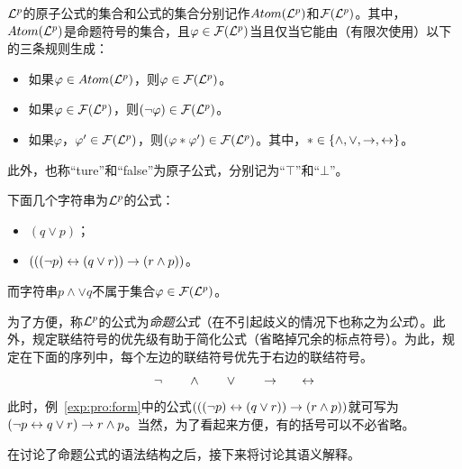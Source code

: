 ${\cal L}^p$的原子公式的集合和公式的集合分别记作$Atom({\cal L}^p)$和${\cal F}({\cal L}^p)$。其中，$Atom({\cal L}^p)$是命题符号的集合，且$\varphi\in {\cal F}({\cal L}^p)$当且仅当它能由（有限次使用）以下的三条规则生成\cite{luzhongwan1989}：
\begin{itemize}
	\item 如果$\varphi\in Atom({\cal L}^p)$，则$\varphi \in {\cal F}({\cal L}^p)$。
	\item 如果$\varphi \in {\cal F}({\cal L}^p)$，则$(\neg \varphi)\in {\cal F}({\cal L}^p)$。
	\item 如果$\varphi$，$\varphi'\in {\cal F}({\cal L}^p)$，则$(\varphi * \varphi')\in {\cal F}({\cal L}^p)$。其中，$*\in \{\wedge,\vee, \rightarrow, \leftrightarrow\}$。
\end{itemize}
此外，也称“ture”和“false”为原子公式，分别记为“$\top$”和“$\bot$”。

\begin{example}\label{exp:pro:form}
	下面几个字符串为${\cal L}^p$的公式：
	\begin{itemize}
		\item $(q \vee p)$；
		\item $(((\neg p)\leftrightarrow(q\vee r))\rightarrow(r \wedge p))$。
	\end{itemize}
	而字符串$p\wedge \vee q$不属于集合$\varphi\in {\cal F}({\cal L}^p)$。
\end{example}


为了方便，称${\cal L}^p$的公式为\emph{命题公式}（在不引起歧义的情况下也称之为\emph{公式}）。此外，规定联结符号的优先级有助于简化公式（省略掉冗余的标点符号）。为此，规定在下面的序列中，每个左边的联结符号优先于右边的联结符号。
\[
\neg \qquad \wedge \qquad \vee \qquad \rightarrow \qquad \leftrightarrow
\]
此时，例~\ref{exp:pro:form}中的公式$(((\neg p)\leftrightarrow(q\vee r))\rightarrow(r \wedge p))$就可写为$(\neg p \leftrightarrow q \vee r) \rightarrow r \wedge p$。当然，为了看起来方便，有的括号可以不必省略。

在讨论了命题公式的语法结构之后，接下来将讨论其语义解释。

